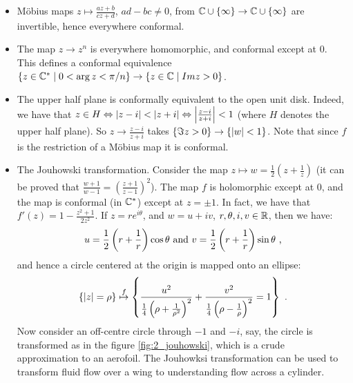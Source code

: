 \begin{itemize}
\item Möbius maps $z \mapsto \frac{az+b}{cz+d}$, $ad - bc \neq 0$, from $\CC \cup \{ \infty \} \rightarrow \CC \cup \{ \infty \}$ are invertible, hence everywhere conformal.
\item The map $z \rightarrow z^n$ is everywhere homomorphic, and conformal except at $0$. This defines a conformal equivalence $\{ z \in \CC^* \mid 0 < \arg z < \pi/n \} \rightarrow \{ z \in \CC \mid Im z > 0 \}$.
\item The upper half plane is conformally equivalent to the open unit disk. Indeed, we have that $z \in H \Leftrightarrow \abs{z - i} < \abs{z + i} \Leftrightarrow \abs*{\frac{z-i}{z+i}} < 1$ (where $H$ denotes the upper half plane). So $z \rightarrow \frac{z-i}{z+i}$ takes $\{ \Im z > 0 \} \rightarrow \{ \abs{w} < 1 \}$. Note that since $f$ is the restriction of a Möbius map it is conformal.
\item The Jouhowski transformation. Consider the map $z \mapsto w = \frac{1}{2}\left(z + \frac{1}{z}\right)$ (it can be proved that $\frac{w + 1}{w - 1} = \left(\frac{z + 1}{z - 1}\right)^2$). 
The map $f$ is holomorphic except at $0$, and the map is conformal (in $\CC^*$) except at $z = \pm 1$. 
In fact, we have that $f'(z) = 1 - \frac{z^2 + 1}{2z^2}$. If $z = re^{i\theta}$, and $w = u + iv$, $r, \theta, i, v \in \RR$, then we have:
\[
u = \frac{1}{2}\left(r + \frac{1}{r}\right)\cos \theta \text{ and } v = \frac{1}{2}\left(r + \frac{1}{r}\right)\sin \theta \mpunct{,}
\]
and hence a circle centered at the origin is mapped onto an ellipse:
\[
\{ \abs{z} = \rho \} \stackrel{f}{\mapsto} \left\{ \frac{u^2}{\frac{1}{4}\left(\rho + \frac{1}{\rho^2}\right)^2} + \frac{v^2}{\frac{1}{4}\left(\rho - \frac{1}{\rho}\right)^2} = 1 \right\} \mpunct{.}
\]
Now consider an off-centre circle through $-1$ and $-i$, say, the circle is transformed as in the figure \ref{fig:2_jouhowski}, which is a crude approximation to an aerofoil. The Jouhowksi transformation can be used to transform fluid flow over a wing to understanding flow across a cylinder.
\end{itemize}

